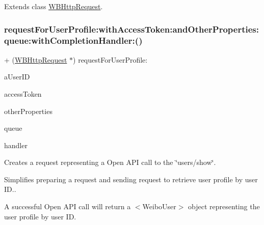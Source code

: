 Extends class \mbox{\hyperlink{interface_w_b_http_request_abb1e37b606f28ab890279b1ce62de963}{W\+B\+Http\+Request}}.

\mbox{\label{category_w_b_http_request_07_weibo_user_08_ac5c54cd942ec3972dce639a4a299d812}} 
\subsubsection{\texorpdfstring{request\+For\+User\+Profile\+:with\+Access\+Token\+:and\+Other\+Properties\+:queue\+:with\+Completion\+Handler\+:()}{requestForUserProfile:withAccessToken:andOtherProperties:queue:withCompletionHandler:()}\hspace{0.1cm}{\footnotesize\ttfamily [1/3]}}
{\footnotesize\ttfamily + (\mbox{\hyperlink{interface_w_b_http_request}{W\+B\+Http\+Request}} $\ast$) request\+For\+User\+Profile\+: \begin{DoxyParamCaption}\item[{(N\+S\+String $\ast$)}]{a\+User\+ID }\item[{withAccessToken:(N\+S\+String $\ast$)}]{access\+Token }\item[{andOtherProperties:(N\+S\+Dictionary $\ast$)}]{other\+Properties }\item[{queue:(N\+S\+Operation\+Queue $\ast$)}]{queue }\item[{withCompletionHandler:(W\+B\+Request\+Handler)}]{handler }\end{DoxyParamCaption}}

Creates a request representing a Open A\+PI call to the \char`\"{}users/show\char`\"{}.

Simplifies preparing a request and sending request to retrieve user profile by user ID..

A successful Open A\+PI call will return a $<$\+Weibo\+User$>$ object representing the user profile by user ID.

